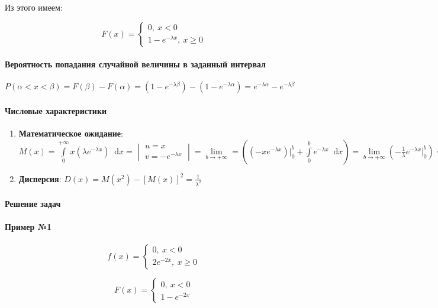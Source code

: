 \documentclass{article}
\newcommand*\diff{\mathop{}\!\mathrm{d}}
\begin{document}
Из этого имеем:

$$
F(x) = \begin{cases}
    0, \ x < 0 \\
    1 - e^{-\lambda x}, \ x \ge 0
\end{cases}
$$

\paragraph{Вероятность попадания случайной величины в заданный интервал}

$P(\alpha < x < \beta) = F(\beta) - F(\alpha) = (1 - e^{-\lambda \beta}) - (1 - e^{-\lambda \alpha}) = e^{-\lambda \alpha} - e^{-\lambda \beta}$ 

\paragraph{Числовые характеристики}

\begin{enumerate}
    \item \textbf{Математическое ожидание}: $M(x) = \int\limits_{0}^{+\infty} x (\lambda e^{-\lambda x}) \diff x = \begin{vmatrix}
        u = x \\
        v = -e^{-\lambda x}   
       \end{vmatrix} = \lim\limits_{b \to +\infty} = ((- x e^{-\lambda x}) \bigg|_{0}^{b} + \int\limits_{0}^{b} e^{-\lambda x} \diff x) = \lim\limits_{b \to +\infty} (- \frac{1}{\lambda} e^{-\lambda x} \bigg|_{0}^{b}) = \frac{1}{\lambda}
       $
    \item \textbf{Дисперсия}: $D(x) = M(x^2) - [M(x)]^2 = \frac{1}{\lambda^2}$
\end{enumerate}

\paragraph{Решение задач}

\paragraph{Пример №1}

$$
f(x) = \begin{cases}
    0, \ x < 0 \\
    2 e^{-2 x}, \ x \ge 0
\end{cases}
$$

$$
F(x) = \begin{cases}
    0, \ x < 0 \\
    1 - e^{-2x}
\end{cases}
$$
\end{document}
